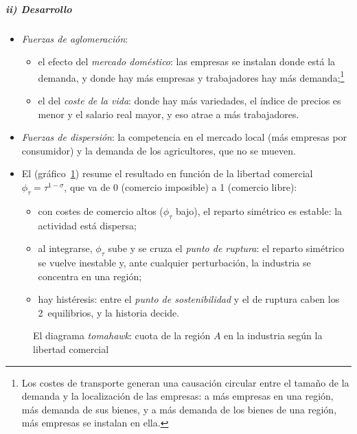 \documentclass[11pt]{article}
\begin{document}
\subparagraph{ii) Desarrollo}

\begin{itemize}
\item \emph{Fuerzas de aglomeración}:
  \begin{itemize}
  \item el efecto del \emph{mercado doméstico}: las empresas se instalan donde está la demanda, y donde hay más empresas y trabajadores hay más demanda;\footnote{Los costes de transporte generan una causación circular entre el tamaño de la demanda y la localización de las empresas: a más empresas en una región, más demanda de sus bienes, y a más demanda de los bienes de una región, más empresas se instalan en ella.}
  \item el del \emph{coste de la vida}: donde hay más variedades, el índice de precios es menor y el salario real mayor, y eso atrae a más trabajadores.
  \end{itemize}
\item \emph{Fuerzas de dispersión}: la competencia en el mercado local (más empresas por consumidor) y la demanda de los agricultores, que no se mueven.
\item El  (gráfico~\ref{fig:tomahawk}) resume el resultado en función de la libertad comercial $\phi_\tau=\tau^{1-\sigma}$, que va de 0 (comercio imposible) a 1 (comercio libre):
  \begin{itemize}
  \item con costes de comercio altos ($\phi_\tau$ bajo), el reparto simétrico es estable: la actividad está dispersa;
  \item al integrarse, $\phi_\tau$ sube y se cruza el \emph{punto de ruptura}: el reparto simétrico se vuelve inestable y, ante cualquier perturbación, la industria se concentra en una región;
  \item hay histéresis: entre el \emph{punto de sostenibilidad} y el de ruptura caben los 2~equilibrios, y la historia decide.
  \end{itemize}
\end{itemize}

\begin{figure}[H]
\centering
\caption{El diagrama \emph{tomahawk}: cuota de la región $A$ en la industria según la libertad comercial}\label{fig:tomahawk}
\end{figure}
\end{document}
